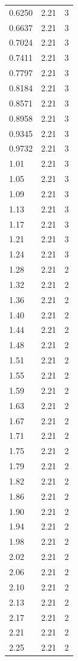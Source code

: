 \begin{longtable}{lrr}
  0.6250 & 2.21 & 3 \\
  0.6637 & 2.21 & 3 \\
  0.7024 & 2.21 & 3 \\
  0.7411 & 2.21 & 3 \\
  0.7797 & 2.21 & 3 \\
  0.8184 & 2.21 & 3 \\
  0.8571 & 2.21 & 3 \\
  0.8958 & 2.21 & 3 \\
  0.9345 & 2.21 & 3 \\
  0.9732 & 2.21 & 3 \\
  1.01 & 2.21 & 3 \\
  1.05 & 2.21 & 3 \\
  1.09 & 2.21 & 3 \\
  1.13 & 2.21 & 3 \\
  1.17 & 2.21 & 3 \\
  1.21 & 2.21 & 3 \\
  1.24 & 2.21 & 3 \\
  1.28 & 2.21 & 2 \\
  1.32 & 2.21 & 2 \\
  1.36 & 2.21 & 2 \\
  1.40 & 2.21 & 2 \\
  1.44 & 2.21 & 2 \\
  1.48 & 2.21 & 2 \\
  1.51 & 2.21 & 2 \\
  1.55 & 2.21 & 2 \\
  1.59 & 2.21 & 2 \\
  1.63 & 2.21 & 2 \\
  1.67 & 2.21 & 2 \\
  1.71 & 2.21 & 2 \\
  1.75 & 2.21 & 2 \\
  1.79 & 2.21 & 2 \\
  1.82 & 2.21 & 2 \\
  1.86 & 2.21 & 2 \\
  1.90 & 2.21 & 2 \\
  1.94 & 2.21 & 2 \\
  1.98 & 2.21 & 2 \\
  2.02 & 2.21 & 2 \\
  2.06 & 2.21 & 2 \\
  2.10 & 2.21 & 2 \\
  2.13 & 2.21 & 2 \\
  2.17 & 2.21 & 2 \\
  2.21 & 2.21 & 2 \\
  2.25 & 2.21 & 2 \\

\end{longtable}
